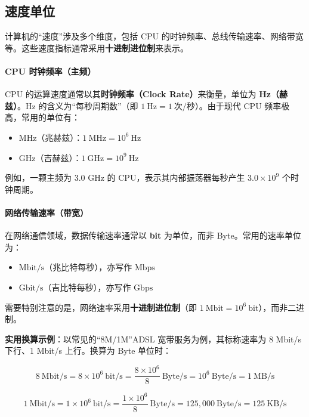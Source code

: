 \documentclass[12pt,UTF8]{ctexbook}
\begin{document}
\subsection{速度单位}

计算机的“速度”涉及多个维度，包括 CPU 的时钟频率、总线传输速率、网络带宽等。这些速度指标通常采用\textbf{十进制进位制}来表示。

\paragraph{CPU 时钟频率（主频）}
CPU 的运算速度通常以其\textbf{时钟频率（Clock Rate）}来衡量，单位为 \textbf{Hz（赫兹）}。Hz 的含义为“每秒周期数”（即 $1\ \text{Hz} = 1\ \text{次/秒}$）。由于现代 CPU 频率极高，常用的单位有：

\begin{itemize}
	\item $\text{MHz}$（兆赫兹）：$1\ \text{MHz} = 10^6\ \text{Hz}$
	\item $\text{GHz}$（吉赫兹）：$1\ \text{GHz} = 10^9\ \text{Hz}$
\end{itemize}

例如，一颗主频为 3.0 GHz 的 CPU，表示其内部振荡器每秒产生 $3.0 \times 10^9$ 个时钟周期。

\paragraph{网络传输速率（带宽）}
在网络通信领域，数据传输速率通常以 \textbf{bit} 为单位，而非 Byte。常用的速率单位为：

\begin{itemize}
	\item $\text{Mbit/s}$（兆比特每秒），亦写作 $\text{Mbps}$
	\item $\text{Gbit/s}$（吉比特每秒），亦写作 $\text{Gbps}$
\end{itemize}

需要特别注意的是，网络速率采用\textbf{十进制进位制}（即 $1\ \text{Mbit} = 10^6\ \text{bit}$），而非二进制。

\textbf{实用换算示例}：以常见的“8M/1M”ADSL 宽带服务为例，其标称速率为 8 Mbit/s 下行、1 Mbit/s 上行。换算为 Byte 单位时：

\begin{equation}
	8\ \text{Mbit/s} = 8 \times 10^6\ \text{bit/s} = \frac{8 \times 10^6}{8}\ \text{Byte/s} = 10^6\ \text{Byte/s} = 1\ \text{MB/s}
\end{equation}

\begin{equation}
	1\ \text{Mbit/s} = 1 \times 10^6\ \text{bit/s} = \frac{1 \times 10^6}{8}\ \text{Byte/s} = 125,000\ \text{Byte/s} = 125\ \text{KB/s}
\end{equation}
\end{document}
